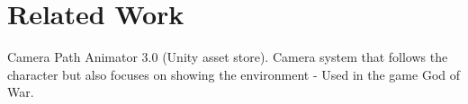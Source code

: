 \section{Related Work}
Camera Path Animator 3.0 (Unity asset store).
Camera system that follows the character but also focuses on showing the environment - Used in the game God of War.